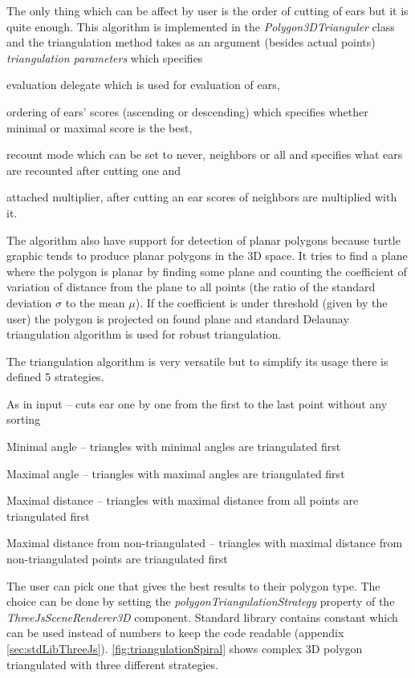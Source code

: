 The only thing which can be affect by user is the order of cutting of ears but it is quite enough.
This algorithm is implemented in the \emph{Polygon3DTrianguler} class and the triangulation method takes as an argument (besides actual points) \emph{triangulation parameters} which specifies
	\begin{inparaenum}[{\itshape a})]
		\item evaluation delegate which is used for evaluation of ears,
		\item ordering of ears' scores (ascending or descending) which specifies whether minimal or maximal score is the best,
		\item recount mode which can be set to never, neighbors or all and specifies what ears are recounted after cutting one and
		\item attached multiplier, after cutting an ear scores of neighbors are multiplied with it.
	\end{inparaenum}
The algorithm also have support for detection of planar polygons because turtle graphic tends to produce planar polygons in the 3D space.
It tries to find a plane where the polygon is planar by finding some plane and counting the coefficient of variation of distance from the plane to all points
	(the ratio of the standard deviation $\sigma$ to the mean $\mu$).
If the coefficient is under threshold (given by the user) the polygon is projected on found plane and standard Delaunay triangulation algorithm is used for robust triangulation.


The triangulation algorithm is very versatile but to simplify its usage there is defined 5 strategies.

\begin{description*}
	\item[As in input] -- cuts ear one by one from the first to the last point without any sorting
	\item[Minimal angle] -- triangles with minimal angles are triangulated first
	\item[Maximal angle] -- triangles with maximal angles are triangulated first
	\item[Maximal distance] -- triangles with maximal distance from all points are triangulated first
	\item[Maximal distance from non-triangulated] -- triangles with maximal distance from non-triangulated points are triangulated first
\end{description*}

The user can pick one that gives the best results to their polygon type.
The choice can be done by setting the \emph{polygonTriangulationStrategy} property of the \emph{ThreeJsSceneRenderer3D} component.
Standard library contains constant which can be used instead of numbers to keep the code readable (appendix \ref{sec:stdLibThreeJs}).
\autoref{fig:triangulationSpiral} shows complex 3D polygon triangulated with three different strategies.


